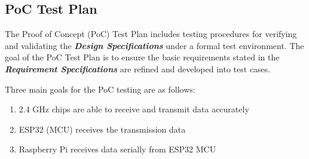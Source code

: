 \subsection{PoC Test Plan}

The Proof of Concept (PoC) Test Plan includes testing procedures for verifying and validating the \textbf{\textit{Design Specifications}} under a formal test environment. The goal of the PoC Test Plan is to ensure the basic requirements stated in the \textbf{\textit{Requirement Specifications}} are refined and developed into test cases.

\medskip
Three main goals for the PoC testing are as follows:
\begin{enumerate}
    \item 2.4 GHz chips are able to receive and transmit data accurately
    \item ESP32 (MCU) receives the transmission data 
    \item Raspberry Pi receives data serially from ESP32 MCU
\end{enumerate}

